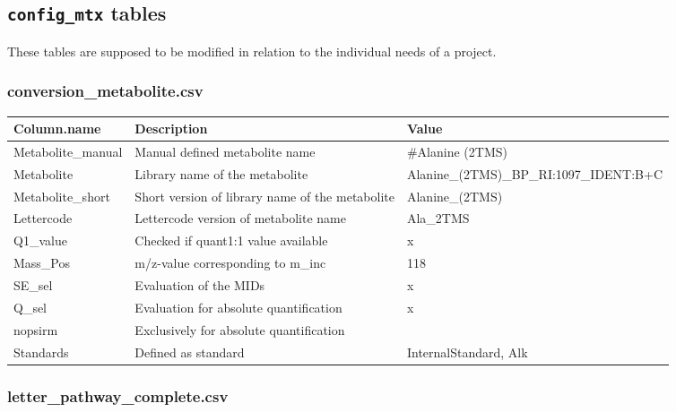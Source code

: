 \documentclass[]{book}
\begin{document}
\hypertarget{config_mtx-tables}{%
\subsection{\texorpdfstring{\texttt{config\_mtx} tables}{config\_mtx tables}}\label{config_mtx-tables}}

These tables are supposed to be modified in relation to the individual needs of a project.

\hypertarget{app:conse}{%
\subsubsection{conversion\_metabolite.csv}\label{app:conse}}

\begin{tabu} to 
\toprule
Column.name & Description & Value\\
\midrule
{}  Metabolite\_manual & Manual defined metabolite name & \#Alanine (2TMS)\\
Metabolite & Library name of the metabolite & Alanine\_(2TMS)\_BP\_RI:1097\_IDENT:B+C\\
  Metabolite\_short & Short version of library name of the metabolite & Alanine\_(2TMS)\\
Lettercode & Lettercode version of metabolite name & Ala\_2TMS\\
  Q1\_value & Checked if quant1:1 value available & x\\
\addlinespace
Mass\_Pos & m/z-value corresponding to m\_inc & 118\\
  SE\_sel & Evaluation of the MIDs & x\\
Q\_sel & Evaluation for absolute quantification & x\\
  nopsirm & Exclusively for absolute quantification & \\
Standards & Defined as standard & InternalStandard, Alk\\
\bottomrule
\end{tabu}

\hypertarget{app:pathway}{%
\subsubsection{letter\_pathway\_complete.csv}\label{app:pathway}}
\end{document}
